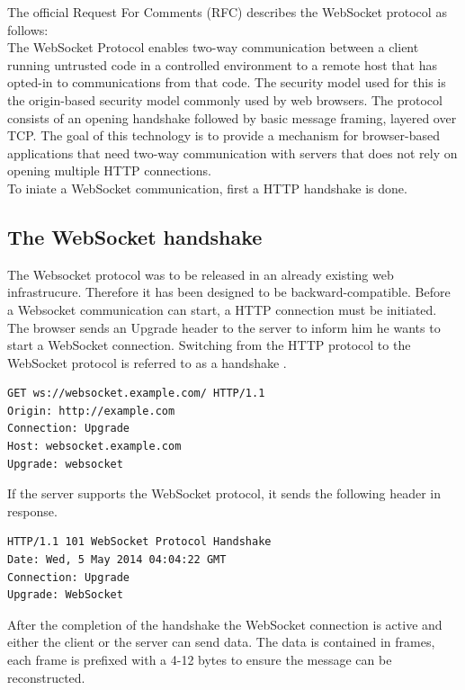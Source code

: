 The official Request For Comments \citep{Reference12} (RFC) describes the
WebSocket protocol as follows:\\

The WebSocket Protocol enables two-way communication between a client running
untrusted code in a controlled environment to a remote host that has opted-in
to communications from that code. The security model used for this is the
origin-based security model commonly used by web browsers. The protocol
consists of an opening handshake followed by basic message framing, layered
over TCP. The goal of this technology is to provide a mechanism for
browser-based applications that need two-way communication with servers that
does not rely on opening multiple HTTP connections.\\

To iniate a WebSocket communication, first a HTTP handshake is done.

\subsection{The WebSocket handshake}

The Websocket protocol was to be released in an already existing web
infrastrucure. Therefore it has been designed to be backward-compatible. Before
a Websocket communication can start, a HTTP connection must be initiated. The
browser sends an Upgrade header to the server to inform him he wants to start a
WebSocket connection. Switching from the HTTP protocol to the WebSocket
protocol is referred to as a handshake \citep{Reference12}.\\

\begin{verbatim}
GET ws://websocket.example.com/ HTTP/1.1
Origin: http://example.com
Connection: Upgrade
Host: websocket.example.com
Upgrade: websocket
\end{verbatim}

If the server supports the WebSocket protocol, it sends the following header in
response.\\

\begin{verbatim}
HTTP/1.1 101 WebSocket Protocol Handshake
Date: Wed, 5 May 2014 04:04:22 GMT
Connection: Upgrade
Upgrade: WebSocket
\end{verbatim}

After the completion of the handshake the WebSocket connection is active and
either the client or the server can send data. The data is contained in frames,
each frame is prefixed with a 4-12 bytes to ensure the message can be
reconstructed. \\ 

